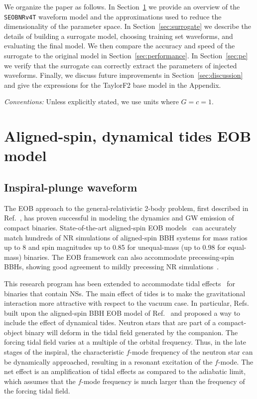 \documentclass[prd,aps,letter,twocolumn,floatfix,notitlepage,nofootinbib]{revtex4-1}
\begin{document}
We organize the paper as follows. In Section~\ref{sec:eob} we provide an overview of the \texttt{SEOBNRv4T} waveform model and the approximations used to reduce the dimensionality of the parameter space. In Section~\ref{sec:surrogate} we describe the details of building a surrogate model, choosing training set waveforms, and evaluating the final model. We then compare the accuracy and speed of the surrogate to the original model in Section~\ref{sec:performance}. In Section~\ref{sec:pe} we verify that the surrogate can correctly extract the parameters of injected waveforms. Finally, we discuss future improvements in Section~\ref{sec:discussion} and give the expressions for the TaylorF2 base model in the Appendix.

\textit{Conventions:} Unless explicitly stated, we use units where $G=c=1$.


\section{Aligned-spin, dynamical tides EOB model}
\label{sec:eob}

\subsection{Inspiral-plunge waveform}

The EOB approach to the general-relativistic 2-body problem, first described in Ref.~\cite{Buonanno:1998gg}, has proven successful in modeling the dynamics and GW emission of compact binaries. State-of-the-art aligned-spin EOB models~\cite{Bohe:2016gbl,Nagar:2017jdw} can accurately match hundreds of NR simulations of aligned-spin BBH systems for mass ratios up to 8 and spin magnitudes up to 0.85 for unequal-mass (up to 0.98 for equal-mass) binaries. The EOB framework can also accommodate precessing-spin BBHs, showing good agreement to mildly precessing NR simulations~\cite{Babak:2016tgq}. 

This research program has been extended to accommodate tidal effects~\cite{Damour:2009wj,Vines:2010ca,Damour:2012yf,Bini:2012gu,Bernuzzi:2014owa,Hinderer:2016eia,Steinhoff:2016rfi,Dietrich:2017feu} for binaries that contain NSs. The main effect of tides is to make the gravitational interaction more attractive with respect to the vacuum case. In particular, Refs.~\cite{Hinderer:2016eia,Steinhoff:2016rfi} built upon the aligned-spin BBH EOB model of Ref.~\cite{Taracchini:2013rva} and proposed a way to include the effect of dynamical tides. Neutron stars that are part of a compact-object binary will deform in the tidal field generated by the companion. The forcing tidal field varies at a multiple of the orbital frequency. Thus, in the late stages of the inspiral, the characteristic $f$-mode frequency of the neutron star can be dynamically approached, resulting in a resonant excitation of the $f$-mode. The net effect is an amplification of tidal effects as compared to the adiabatic limit, which assumes that the $f$-mode frequency is much larger than the frequency of the forcing tidal field.
\end{document}
